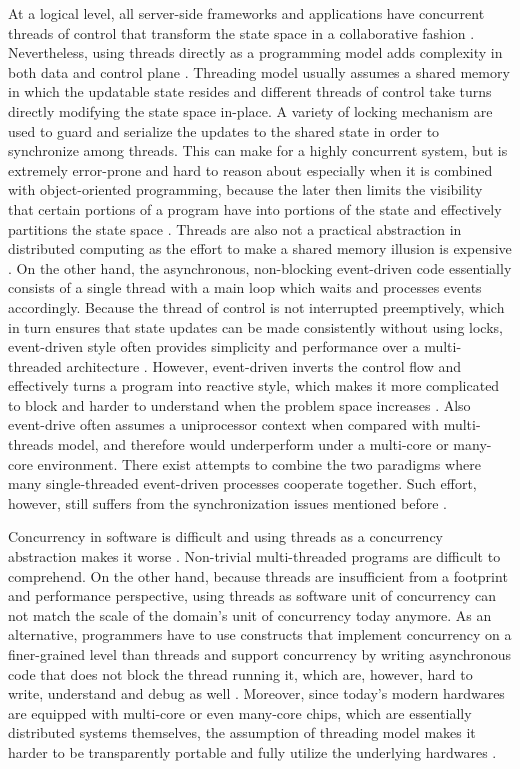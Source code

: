 At a logical level, all server-side frameworks and applications have concurrent threads of control that transform the state space in a collaborative fashion \autocite{UCAM-CL-TR-769}. Nevertheless, using threads directly as a programming model adds complexity in both data and control plane \autocite{UCAM-CL-TR-769}\autocite{Lee:2006:PT:1137232.1137289}. Threading model usually assumes a shared memory in which the updatable state resides and different threads of control take turns directly modifying the state space in-place. A variety of locking mechanism are used to guard and serialize the updates to the shared state in order to synchronize among threads. This can make for a highly concurrent system, but is extremely error-prone and hard to reason about especially when it is combined with object-oriented programming, because the later then limits the visibility that certain portions of a program have into portions of the state and effectively partitions the state space \autocite{Lee:2006:PT:1137232.1137289}. Threads are also not a practical abstraction in distributed computing as the effort to make a shared memory illusion is expensive \autocite{Lee:2006:PT:1137232.1137289}. On the other hand, the asynchronous, non-blocking event-driven code essentially consists of a single thread with a main loop which waits and processes events accordingly. Because the thread of control is not interrupted preemptively, which in turn ensures that state updates can be made consistently without using locks, event-driven style often provides simplicity and performance over a multi-threaded architecture \autocite{UCAM-CL-TR-769}. However, event-driven inverts the control flow and effectively turns a program into reactive style, which makes it more complicated to block and harder to understand when the problem space increases \autocite{von2003events}. Also event-drive often assumes a uniprocessor context when compared with multi-threads model, and therefore would underperform under a multi-core or many-core environment. There exist attempts to combine the two paradigms where many single-threaded event-driven processes cooperate together. Such effort, however, still suffers from the synchronization issues mentioned before \autocite{von2003events}.

Concurrency in software is difficult and using threads as a concurrency abstraction makes it worse \autocite{Lee:2006:PT:1137232.1137289}. Non-trivial multi-threaded programs are difficult to comprehend. On the other hand, because threads are insufficient from a footprint and performance perspective, using threads as software unit of concurrency can not match the scale of the domain's unit of concurrency today anymore. As an alternative, programmers have to use constructs that implement concurrency on a finer-grained level than threads and support concurrency by writing asynchronous code that does not block the thread running it, which are, however, hard to write, understand and debug as well \autocite{java-loom}. Moreover, since today's modern hardwares are equipped with multi-core or even many-core chips, which are essentially distributed systems themselves, the assumption of threading model makes it harder to be transparently portable and fully utilize the underlying hardwares \autocite{UCAM-CL-TR-769}. 

